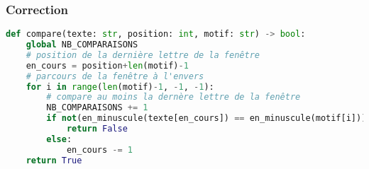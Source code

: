 \documentclass[svgnames,11pt]{beamer}
\begin{document}
\begin{frame}[fragile]
    \frametitle{Correction}

    \begin{center}
    \begin{lstlisting}[language=Python , basicstyle=\small, xleftmargin=2em, xrightmargin=2em]
def compare(texte: str, position: int, motif: str) -> bool:
    global NB_COMPARAISONS
    # position de la dernière lettre de la fenêtre
    en_cours = position+len(motif)-1
    # parcours de la fenêtre à l'envers
    for i in range(len(motif)-1, -1, -1):
        # compare au moins la dernère lettre de la fenêtre
        NB_COMPARAISONS += 1
        if not(en_minuscule(texte[en_cours]) == en_minuscule(motif[i])):
            return False
        else:
            en_cours -= 1
    return True
\end{lstlisting}
    \end{center}

\end{frame}
\end{document}
